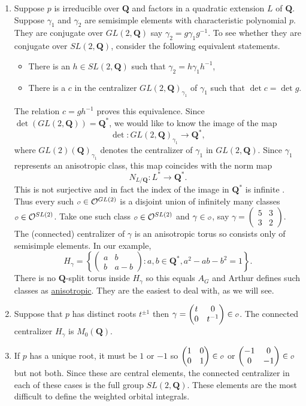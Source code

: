 \documentclass{ims9x6}
\def\Q{\mathbf Q}
\def\O{\mathcal O}
\def\o{\scalebox{0.7}{$\scriptstyle\mathcal{O}$}}
\def\det{\operatorname{det}}
\begin{document}
\begin{enumerate}
	\item Suppose $p$ is irreducible over $\Q$ and factors in a quadratic extension $L$ of $\Q$. Suppose $\gamma_1$ and $\gamma_2$ are semisimple elements with characteristic polynomial $p$. They are conjugate over $GL(2, \Q)$ say $\gamma_2 = g \gamma_1 g^{-1}$. To see whether they are conjugate over $SL(2, \Q)$, consider the following equivalent statements. 
	\begin{itemize}
		\item There is an $h \in SL(2, \Q)$ such that $\gamma_2 = h \gamma_1 h^{-1}$,
		\item There is a $c$ in the centralizer $GL(2, \Q)_{\gamma_1}$ of $\gamma_1$ such that $\det c = \det g$. 
	\end{itemize}
		The relation $c = gh^{-1}$ proves this equivalence. Since $\det(GL(2, \Q)) = \Q^*$, we would like to know the image of the map
    		\[ \det : GL(2, \Q)_{\gamma_1} \to \Q^*, \]
		where $GL(2)(\Q)_{\gamma_1}$ denotes the centralizer of $\gamma_1$ in $GL(2, \Q)$. Since $\gamma_1$ represents an anisotropic class, this map coincides with the norm map
		\[ N_{L/\Q} : L^* \to \Q^*. \]
		This is not surjective and in fact the index of the image in $\Q^*$ is infinite \cite{MR1068677}. Thus every such $\o \in \O^{GL(2)}$ is a disjoint union of infinitely many classes $\o \in \O^{SL(2)}$. Take one such class $\o \in \O^{SL(2)}$ and $\gamma \in \o$, say $\gamma = \begin{pmatrix} 5 & 3 \\ 3 & 2 \end{pmatrix}$. The (connected) centralizer of $\gamma$ is an anisotropic torus so consists only of semisimple elements. In our example, 
		\[ H_\gamma = \left\{ \begin{pmatrix} a & b \\ b & a - b \end{pmatrix} : a, b \in \Q^*, a^2 - ab - b^2 = 1 \right\}. \]
		There is no $\Q$-split torus inside $H_\gamma$ so this equals $A_G$ and Arthur defines such classes as \underline{anisotropic}. They are the easiest to deal with, as we will see. 
	\item Suppose that $p$ has distinct roots $t^{\pm 1}$ then $\gamma = \begin{pmatrix} t & 0 \\ 0 & t^{-1} \end{pmatrix} \in \o$. The connected centralizer $H_\gamma$ is $M_0(\Q)$. 
	\item If $p$ has a unique root, it must be $1$ or $-1$ so $\begin{pmatrix} 1 & 0 \\ 0 & 1 \end{pmatrix} \in \o$ or $\begin{pmatrix} -1 & 0 \\ 0 & -1 \end{pmatrix} \in \o$ but not both. Since these are central elements, the connected centralizer in each of these cases is the full group $SL(2, \Q)$. These elements are the most difficult to define the weighted orbital integrals. 
\end{enumerate}
\end{document}
